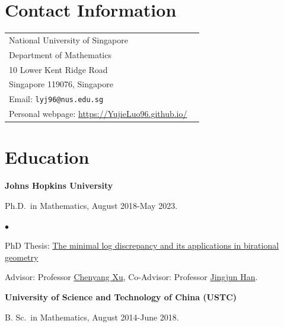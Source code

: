 \documentclass[margin,line,pifont,palatino,courier]{res}
\newenvironment{list1}{
  \begin{list}{\ding{113}}{%
      \setlength{\itemsep}{0in}
      \setlength{\parsep}{0in} \setlength{\parskip}{0in}
      \setlength{\topsep}{0in} \setlength{\partopsep}{0in}
      \setlength{\leftmargin}{0.17in}}}{\end{list}}
\newenvironment{list2}{
  \begin{list}{$\bullet$}{%
      \setlength{\itemsep}{0in}
      \setlength{\parsep}{0in} \setlength{\parskip}{0in}
      \setlength{\topsep}{0in} \setlength{\partopsep}{0in}
      \setlength{\leftmargin}{0.2in}}}{\end{list}}
\begin{document}

\begin{resume}



\section{\sc Contact Information}

\vspace{.05in}
\begin{tabular}{@{}p{3.75in}p{2in}}
National University of Singapore  \\
Department of Mathematics            \\              
10 Lower Kent Ridge Road   \\               
Singapore 119076, Singapore    \\
Email: \texttt{lyj96@nus.edu.sg}\\
Personal webpage: \url{https://YujieLuo96.github.io/}\\
\end{tabular}

\section{\sc Education}

{\bf  Johns Hopkins University}\\
\vspace*{-.1in}
\begin{list1}
\item[] Ph.D.~in Mathematics, August 2018-May 2023.

\begin{list2}
\vspace*{.05in}
\item PhD Thesis: \href{https://jscholarship.library.jhu.edu/items/af3668a1-356b-4425-af17-4465dd465f84}{The minimal log discrepancy and its applications in birational geometry}
\item Advisor: Professor \href{https://web.math.princeton.edu/~chenyang/}{Chenyang Xu}, Co-Advisor: Professor \href{https://jingjunhan.github.io/}{Jingjun Han}.
\end{list2}
\end{list1}



{\bf University of Science and Technology of China (USTC)}\\
\vspace*{-.1in}
\begin{list1}
\item[] B. Sc.~in Mathematics, August 2014-June 2018.


\end{list1}
\end{resume}
\end{document}
